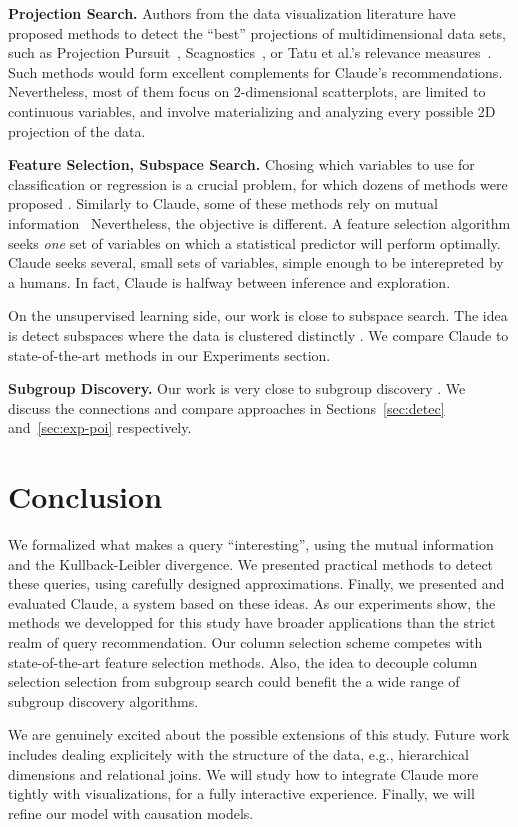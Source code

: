 \textbf{Projection Search.} Authors from the data visualization literature have
proposed methods to detect the ``best'' projections of multidimensional data
sets, such as Projection Pursuit~\cite{yoi1974projection},
Scagnostics~\cite{wilkinson2005graph}, or Tatu et al.'s relevance
measures~\cite{tatu2011automated}. Such methods would form excellent complements
for Claude's recommendations. Nevertheless, most of them focus on 2-dimensional
scatterplots, are limited to continuous variables, and involve materializing
and analyzing every possible 2D projection of the data.

\textbf{Feature Selection, Subspace Search.} Chosing which variables to use for
classification or regression is a crucial problem, for which dozens of methods
were proposed \cite{guyon2003introduction}. Similarly to Claude, some of these
methods rely on mutual information~\cite{peng2005feature} Nevertheless, the
objective is different. A feature selection algorithm seeks \emph{one} set of
variables on which a statistical predictor will perform optimally. Claude seeks
several, small sets of variables, simple enough to be interepreted by a humans.
In fact, Claude is halfway between inference and exploration.

On the unsupervised learning side, our work is close to subspace search. The
idea is detect subspaces where the data is clustered distinctly
\cite{keller2012hics,nguyen20134s}. We compare Claude to state-of-the-art
methods in our Experiments section.

\textbf{Subgroup Discovery.} Our work is very close to subgroup discovery
\cite{klosgen1996explora, wrobel1997algorithm, van2011non}. We discuss the
connections and compare approaches in Sections~\ref{sec:detec}
and~\ref{sec:exp-poi} respectively.

\section{Conclusion}
\label{sec:conclusion}
We formalized what makes a query ``interesting'', using the mutual information
and the Kullback-Leibler divergence. We presented practical methods to detect
these queries, using carefully designed approximations.  Finally, we presented
and evaluated Claude, a system based on these ideas. As our experiments show,
the methods we developped for this study have broader applications than the
strict realm of query recommendation. Our column selection scheme competes with
state-of-the-art feature selection methods. Also, the idea to decouple column
selection selection from subgroup search could benefit the a wide range of
subgroup discovery algorithms.

We are genuinely excited about the possible extensions of this study. Future
work includes dealing explicitely with the structure of the data, e.g.,
hierarchical dimensions and relational joins. We will study how to integrate
Claude more tightly with visualizations, for a fully interactive experience.
Finally, we will refine our model with causation models.
